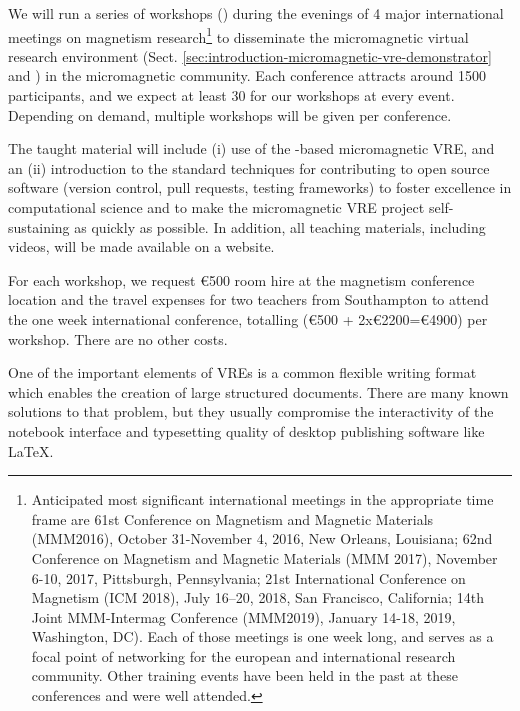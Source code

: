 \begin{workpackage}
\begin{tasklist}
\begin{task}[title=Micromagnetic VRE dissemination workshops,
id=dissemination-of-oommf-nb-workshops,lead=USO,PM=6]
We will run a series of workshops
() during the evenings of 4 major
international meetings on magnetism research\footnote{Anticipated most
  significant international meetings in the appropriate time frame are
  61st Conference on Magnetism and Magnetic Materials (MMM2016), October
  31-November 4, 2016, New Orleans, Louisiana; 62nd Conference on
  Magnetism and Magnetic Materials (MMM 2017), November 6-10, 2017, Pittsburgh,
  Pennsylvania; 21st International Conference on Magnetism (ICM 2018),
  July 16–20, 2018, San Francisco, California; 14th Joint MMM-Intermag
  Conference (MMM2019), January 14-18, 2019, Washington, DC). Each of those
  meetings is one week long, and serves as a focal point of networking
  for the european and international research community. Other training events have been held in the
past at these conferences and were well attended.} to
disseminate the micromagnetic virtual research environment
(Sect. \ref{sec:introduction-micromagnetic-vre-demonstrator} and  
) in the
micromagnetic community. Each conference
attracts around 1500 participants, and we expect at least 30 for our
workshops at every event. Depending on demand, multiple workshops
will be given per conference.

The taught material will include (i) use of the \Jupyter-based
micromagnetic VRE, and an (ii) introduction to the standard techniques
for contributing to open source software (version control, pull
requests, testing frameworks) to foster excellence in computational
science and to make the micromagnetic VRE project self-sustaining as quickly
as possible. In addition, all teaching materials, including videos,
will be made available on a website.

For each workshop, we request \euro{500} room hire at the magnetism conference
location and the travel expenses for two teachers from Southampton to
attend the one week international conference, totalling (\euro{500} +
2x\euro{2200}=\euro{4900}) per workshop. There are no other costs.
\end{task}

\begin{task}[title=Demonstrator: Interactive books,
id=ibook,lead=US,PM=30]

One of the important elements of VREs is a common flexible writing format which
enables the creation of large structured documents. There are many
known solutions to that problem, but they usually compromise the
interactivity of the notebook interface and typesetting quality of desktop
publishing software like LaTeX.


\end{task}
\end{tasklist}
\end{workpackage}

